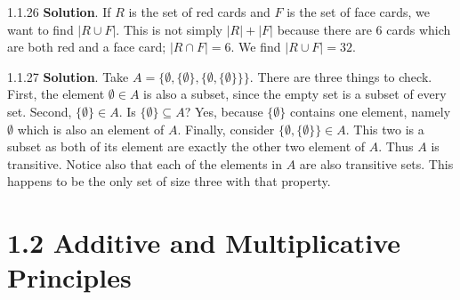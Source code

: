 \documentclass[11pt,]{book}
\theoremstyle{ptxplainnotitle}
\theoremstyle{ptxplaintitle}
\theoremstyle{ptxdefinitionnotitle}
\theoremstyle{ptxdefinitiontitle}
\theoremstyle{ptxdefinitionnotitle}
\theoremstyle{ptxdefinitiontitle}
\theoremstyle{ptxdefinitionnotitle}
\theoremstyle{ptxdefinitiontitle}
\theoremstyle{ptxdefinitiontitlenonumber}
\theoremstyle{ptxdefinitiontitlenonumber}
\numberwithin{equation}{chapter}
\begin{document}
\begin{divisionexercise}{1.1.26}
\textbf{Solution}.\quad%
\hypertarget{p-1025}{}%
If \(R\) is the set of red cards and \(F\) is the set of face cards, we want to find \(|R \cup F|\). This is not simply \(|R| + |F|\) because there are 6 cards which are both red and a face card; \(|R \cap F| = 6\). We find \(|R \cup F| = 32\).%
\end{divisionexercise}%
\begin{divisionexercise}{1.1.27}
\textbf{Solution}.\quad%
\hypertarget{p-1027}{}%
Take \(A = \{\emptyset, \{\emptyset\}, \{\emptyset, \{\emptyset\}\}\}\).  There are three things to check.  First, the element \(\emptyset \in A\) is also a subset, since the empty set is a subset of every set.  Second, \(\{\emptyset\}\in A\).  Is \(\{\emptyset\} \subseteq A\)?  Yes, because \(\{\emptyset\}\) contains one element, namely \(\emptyset\) which is also an element of \(A\). Finally, consider \(\{\emptyset, \{\emptyset\}\}\in A\).  This two is a subset as both of its element are exactly the other two element of \(A\).  Thus \(A\) is transitive.  Notice also that each of the elements in \(A\) are also transitive sets.  This happens to be the only set of size three with that property.%
\end{divisionexercise}%
\section*{1.2 Additive and Multiplicative Principles}
\end{document}
